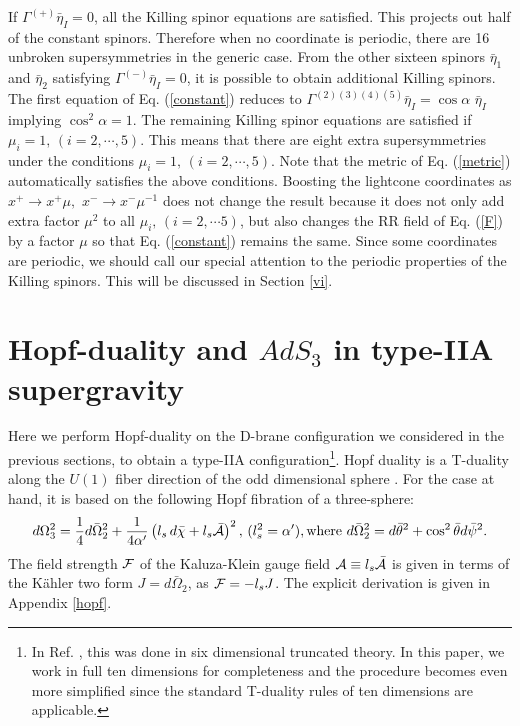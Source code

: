 \documentclass[a4paper,12pt]{article}
\begin{document}
If $\Gamma^{(+)}\bar{\eta}_I=0$, all the Killing spinor equations are satisfied. This projects out half of the constant spinors.  Therefore when no coordinate is periodic, there are 16 unbroken supersymmetries in the generic case. From the other sixteen spinors $\bar{\eta}_1$ and $\bar{\eta}_2$ satisfying $\Gamma^{(-)}\bar{\eta}_I=0$, it is possible to obtain additional Killing spinors. The first equation of Eq. (\ref{constant}) reduces to $\Gamma^{(2)(3)(4)(5)}\bar{\eta}_I=\cos{\alpha}\,\,\bar{\eta}_I$ implying $\cos^2{\alpha}=1$. The remaining Killing spinor equations are satisfied if $\mu_i=1,\, (i=2,\cdots,5)$. This means that there are eight extra supersymmetries under the conditions $\mu_i=1,\, (i=2,\cdots,5)$. Note that the metric of Eq. (\ref{metric}) automatically satisfies the above conditions. Boosting the lightcone coordinates as $x^+\rightarrow x^+\mu,\,\, x^-\rightarrow x^-\mu^{-1}$ does not change the result because it does not only add extra factor $\mu^2$ to all $\mu_i,\,(i=2,\cdots 5)$, but also changes the RR field of Eq. (\ref{F}) by a factor $\mu$ so that Eq. (\ref{constant}) remains the same. Since some coordinates are periodic, we should call our special attention to the periodic properties of the Killing spinors. This will be discussed in Section \ref{vi}.

\section{Hopf-duality and $AdS_3$ in type-IIA supergravity}\label{iv}

Here we perform Hopf-duality on the D-brane configuration we considered in the previous sections, to obtain a type-IIA configuration\footnote{In Ref. \cite{duff}, this was done in six dimensional truncated theory. In this paper, we work in full ten dimensions for completeness and the procedure becomes even more simplified since the standard T-duality rules of ten dimensions are applicable.}.
Hopf duality is a T-duality along the $U(1)$ fiber direction of the odd dimensional sphere \cite{duff}. For the case at hand, it is based on the following Hopf fibration of a three-sphere: 
\begin{eqnarray}
d\Omega_3^2=\frac{1}{4}d\bar{\Omega}_2^2+\frac{1}{4\alpha'}\left(l_s\,d\bar{\chi}+l_s\bar{{\cal A}}\right)^2,\, (l_s^2=\alpha'), {\rm where} \ d\bar{\Omega}_2^2 =d\bar{\theta}^2 + 
\cos ^2\bar{\theta} d\bar{\psi}^2.
\end{eqnarray} 
The field strength ${\cal F}$ of the Kaluza-Klein gauge field ${\cal A}\equiv l_s\bar{{\cal A}}$ is given in terms of the K\"{a}hler two form $J=d\bar{\Omega}_2$, as  ${\cal F}=-l_sJ$. The explicit derivation is given in Appendix \ref{hopf}.
\end{document}
